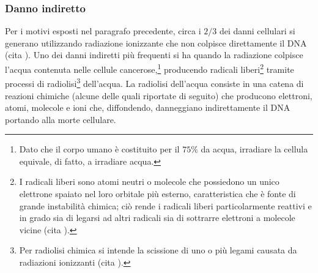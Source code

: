 \documentclass[12pt,a4paper,twoside]{report}
\begin{document}
	\subsubsection{Danno indiretto}\label{par:danno_indiretto}
	Per i motivi esposti nel paragrafo precedente, circa i $2/3$ dei danni cellulari si generano utilizzando radiazione ionizzante che non colpisce direttamente il DNA (cita
	). Uno dei danni indiretti più frequenti si ha quando la radiazione colpisce l'acqua contenuta nelle cellule cancerose,\footnote{Dato che il corpo umano è costituito per il $75\%$ da acqua, irradiare la cellula equivale, di fatto, a irradiare acqua.} producendo radicali liberi\footnote{I radicali liberi sono atomi neutri o molecole che possiedono un unico elettrone spaiato nel loro orbitale più esterno, caratteristica che è fonte di grande instabilità chimica; ciò rende i radicali liberi particolarmente reattivi e in grado sia di legarsi ad altri radicali sia di sottrarre elettroni a molecole vicine (cita
	).} tramite processi di radiolisi\footnote{Per radiolisi chimica si intende la scissione di uno o più legami causata da radiazioni ionizzanti (cita
	).} dell'acqua. La radiolisi dell'acqua consiste in una catena di reazioni chimiche (alcune delle quali riportate di seguito) che producono elettroni, atomi, molecole e ioni che, diffondendo, danneggiano indirettamente il DNA portando alla morte cellulare.
	
\end{document}
